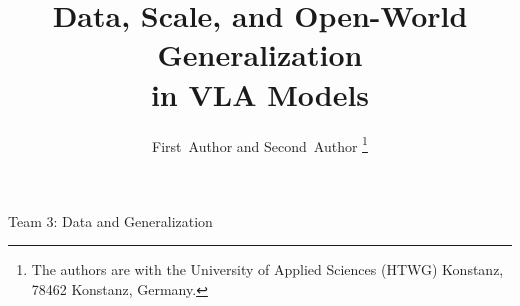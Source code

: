 \documentclass[lettersize,journal]{IEEEtran}
\begin{document}

\title{Data, Scale, and Open-World Generalization\\in VLA Models}

\author{First~Author and Second~Author%
\thanks{The authors are with the University of Applied Sciences (HTWG) Konstanz, 78462 Konstanz, Germany.}}

%
{Team 3: Data and Generalization}

\maketitle









\end{document}
